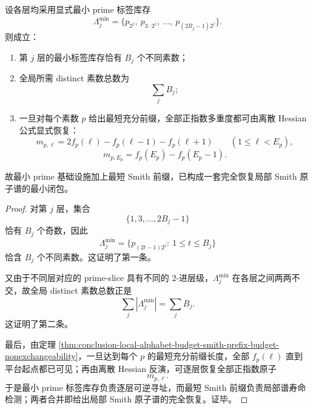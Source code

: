 \begin{theorem}\label{thm:conclusion-minimal-prime-infrastructure-smith-atomic-recovery}
设各层均采用显式最小 prime 标签库存
\[
\Lambda_j^{\min}
=
\{p_{2^j},\ p_{3\cdot 2^j},\ \dots,\ p_{(2B_j-1)2^j}\}.
\]
则成立：
\begin{enumerate}
  \item 第 \(j\) 层的最小标签库存恰有 \(B_j\) 个不同素数；
  \item 全局所需 distinct 素数总数为
  \[
  \sum_j B_j;
  \]
  \item 一旦对每个素数 \(p\) 给出最短充分前缀，全部正指数多重度都可由离散 Hessian 公式显式恢复：
  \[
  m_{p,\ell}=2f_p(\ell)-f_p(\ell-1)-f_p(\ell+1)
  \qquad (1\le \ell<E_p),
  \]
  \[
  m_{p,E_p}=f_p(E_p)-f_p(E_p-1).
  \]
\end{enumerate}
故最小 prime 基础设施加上最短 Smith 前缀，已构成一套完全恢复局部 Smith 原子谱的最小闭包。
\end{theorem}
\begin{proof}
对第 \(j\) 层，集合
\[
\{1,3,\dots,2B_j-1\}
\]
恰有 \(B_j\) 个奇数，因此
\[
\Lambda_j^{\min}
=
\{p_{(2t-1)2^j}:\ 1\le t\le B_j\}
\]
恰含 \(B_j\) 个不同素数。这证明了第一条。

又由于不同层对应的 prime-slice 具有不同的 \(2\)-进层级，\(\Lambda_j^{\min}\) 在各层之间两两不交，故全局 distinct 素数总数正是
\[
\sum_j |\Lambda_j^{\min}|=\sum_j B_j.
\]
这证明了第二条。

最后，由定理 \ref{thm:conclusion-local-alphabet-budget-smith-prefix-budget-nonexchangeability}，一旦达到每个 \(p\) 的最短充分前缀长度，全部 \(f_p(\ell)\) 直到平台起点都已可见；再由离散 Hessian 反演，可逐层恢复全部正指数原子
\[
m_{p,\ell}.
\]
于是最小 prime 标签库存负责逐层可逆寻址，而最短 Smith 前缀负责局部谱寿命检测；两者合并即给出局部 Smith 原子谱的完全恢复。证毕。
\end{proof}
